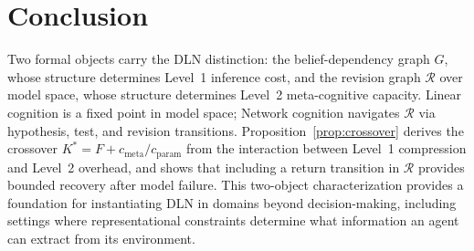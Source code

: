 \documentclass[11pt]{article}
\begin{document}
\section{Conclusion}

Two formal objects carry the DLN distinction: the belief-dependency graph $G$,
whose structure determines Level~1 inference cost, and the revision graph
$\mathcal{R}$ over model space, whose structure determines Level~2 meta-cognitive
capacity.  Linear cognition is a fixed point in model space; Network cognition
navigates $\mathcal{R}$ via hypothesis, test, and revision transitions.
Proposition~\ref{prop:crossover} derives the crossover
$K^* = F + c_{\mathrm{meta}}/c_{\mathrm{param}}$ from the interaction between
Level~1 compression and Level~2 overhead, and shows that including a return
transition in $\mathcal{R}$ provides bounded recovery after model failure.  This
two-object characterization provides a foundation for instantiating DLN in
domains beyond decision-making, including settings where representational
constraints determine what information an agent can extract from its
environment.
\end{document}

